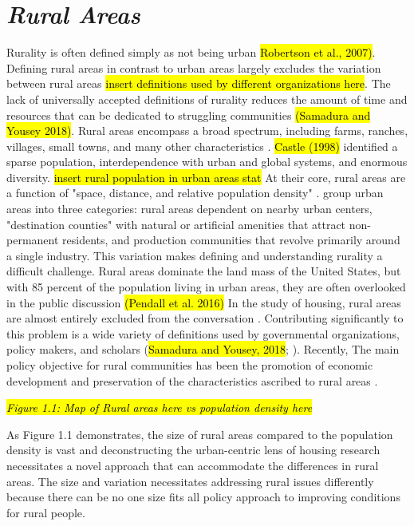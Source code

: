 \section{\textit{Rural Areas}}
 Rurality is often defined simply as not being urban \hl{Robertson et al., 2007)}. Defining rural areas in contrast to urban areas largely excludes the variation between rural areas \hl{insert definitions used by different organizations here}.   The lack of universally accepted definitions of rurality reduces the amount of time and resources that can be dedicated to struggling communities \hl{(Samadura and Yousey 2018)}. Rural areas encompass a broad spectrum, including farms, ranches, villages, small towns, and many other characteristics \citep{cromartie_defining_2008}.  \hl{Castle (1998)} identified a sparse population, interdependence with urban and global systems, and enormous diversity. 
 \hl{insert rural population in urban areas stat} At their core, rural areas are a function of "space, distance, and relative population density" \citep[?]{castle_place_2011}.\citet{shoup_principles_2010} group urban areas into three categories: rural areas dependent on nearby urban centers, "destination counties" with natural or artificial amenities that attract non-permanent residents, and production communities that revolve primarily around a single industry. This variation  makes defining and understanding rurality a difficult challenge. Rural areas dominate the land mass of the United States, but with 85 percent of the population living in urban areas, they are often overlooked in the public discussion \hl{(Pendall et al. 2016)} In the study of housing, rural areas are almost entirely excluded from the conversation \citep{gkartzios_housing_2017}. Contributing significantly to this problem is a wide variety of definitions used by governmental organizations, policy makers, and scholars (\hl{Samadura and Yousey, 2018}; \citealp{cromartie_defining_2008}). Recently, The main policy objective for rural communities has been the promotion of economic development and preservation of the characteristics ascribed to rural areas \citep{lichter_changing_2007}. 

\textit{\hl{Figure 1.1: Map of Rural areas here vs population density here}} %

As Figure 1.1 demonstrates, the size of rural areas compared to the population density is vast and deconstructing the urban-centric lens of housing research necessitates a novel approach that can accommodate the differences in rural areas. The size and variation necessitates addressing rural issues differently because there can be no one size fits all policy approach to improving conditions for rural people. 

